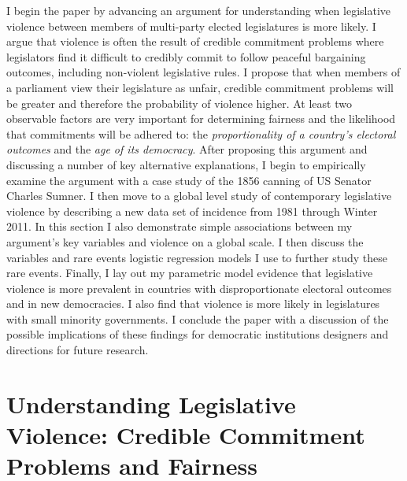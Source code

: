 \documentclass[a4paper]{article}\usepackage[]{graphicx}\usepackage[]{color}
\begin{document}
I begin the paper by advancing an argument for understanding when legislative violence between members of multi-party elected legislatures is more likely. I argue that violence is often the result of credible commitment problems where legislators find it difficult to credibly commit to follow peaceful bargaining outcomes, including non-violent legislative rules. I propose that when members of a parliament view their legislature as unfair, credible commitment problems will be greater and therefore the probability of violence higher. At least two observable factors are very important for determining fairness and the likelihood that commitments will be adhered to: the \emph{proportionality of a country's electoral outcomes} and the \emph{age of its democracy}. After proposing this argument and discussing a number of key alternative explanations, I begin to empirically examine the argument with a case study of the 1856 canning of US Senator Charles Sumner. I then move to a global level study of contemporary legislative violence by describing a new data set of incidence from 1981 through Winter 2011. In this section I also demonstrate simple associations between my argument's key variables and violence on a global scale. I then discuss the variables and rare events logistic regression models \citep{KingRareEvents2001, KingRareEventsPA2001} I use to further study these rare events. Finally, I lay out my parametric model evidence that legislative violence is more prevalent in countries with disproportionate electoral outcomes and in new democracies. I also find that violence is more likely in legislatures with small minority governments. I conclude the paper with a discussion of the possible implications of these findings for democratic institutions designers and directions for future research.


\section{Understanding Legislative Violence: Credible Commitment Problems and Fairness}
\end{document}
